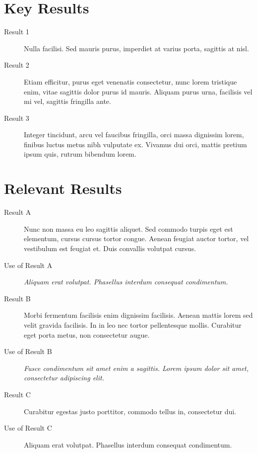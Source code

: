 \documentclass[10pt,letterpaper,twocolumn,landscape]{article}
\begin{document}

\section{Key Results}

\begin{description}
	\item [Result 1] Nulla facilisi. Sed mauris purus, imperdiet at varius porta, sagittis at nisl. 
    \item [Result 2] Etiam efficitur, purus eget venenatis consectetur, nunc lorem tristique enim, vitae sagittis dolor purus id mauris. Aliquam purus urna, facilisis vel mi vel, sagittis fringilla ante. 
    \item [Result 3] Integer tincidunt, arcu vel faucibus fringilla, orci massa dignissim lorem, finibus luctus metus nibh vulputate ex. Vivamus dui orci, mattis pretium ipsum quis, rutrum bibendum lorem.
\end{description}

\section{Relevant Results}

\begin{description}
	\item [Result A] Nunc non massa eu leo sagittis aliquet. Sed commodo turpis eget est elementum, cursus cursus tortor congue. Aenean feugiat auctor tortor, vel vestibulum est feugiat et. Duis convallis volutpat cursus. 
    \item [Use of Result A] \emph{Aliquam erat volutpat. Phasellus interdum consequat condimentum.}
    \item [Result B] Morbi fermentum facilisis enim dignissim facilisis. Aenean mattis lorem sed velit gravida facilisis. In in leo nec tortor pellentesque mollis. Curabitur eget porta metus, non consectetur augue. 
    \item [Use of Result B] \emph{Fusce condimentum sit amet enim a sagittis. Lorem ipsum dolor sit amet, consectetur adipiscing elit.}
    \item [Result C] Curabitur egestas justo porttitor, commodo tellus in, consectetur dui.
    \item [Use of Result C] Aliquam erat volutpat. Phasellus interdum consequat condimentum. 
\end{description}


\end{document}
